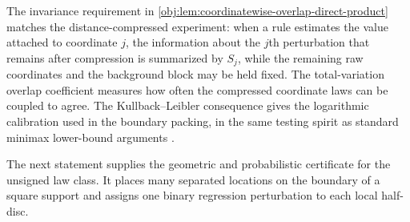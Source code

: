 The invariance requirement in \cref{obj:lem:coordinatewise-overlap-direct-product} matches the distance-compressed experiment: when a rule estimates the value attached to coordinate \(j\), the information about the \(j\)th perturbation that remains after compression is summarized by \(S_j\), while the remaining raw coordinates and the background block may be held fixed. The total-variation overlap coefficient measures how often the compressed coordinate laws can be coupled to agree. The Kullback--Leibler consequence gives the logarithmic calibration used in the boundary packing, in the same testing spirit as standard minimax lower-bound arguments \citep{Stone1982,Tsybakov2009}.

The next statement supplies the geometric and probabilistic certificate for the unsigned law class. It places many separated locations on the boundary of a square support and assigns one binary regression perturbation to each local half-disc.

